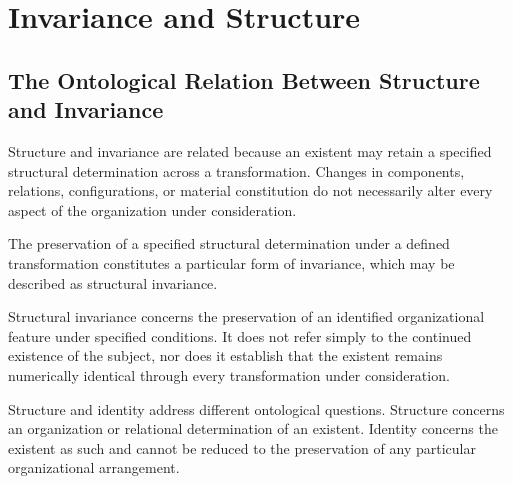 %
%
%
%
%

\section{Invariance and Structure}
\label{sec:invariance-and-structure}

\subsection{The Ontological Relation Between Structure and Invariance}

Structure and invariance are related because an existent
may retain a specified structural determination across
a transformation. Changes in components, relations,
configurations, or material constitution do not necessarily
alter every aspect of the organization under consideration.

The preservation of a specified structural determination
under a defined transformation constitutes a particular
form of invariance, which may be described as structural
invariance.

Structural invariance concerns the preservation of an
identified organizational feature under specified
conditions. It does not refer simply to the continued
existence of the subject, nor does it establish that
the existent remains numerically identical through
every transformation under consideration.

Structure and identity address different ontological
questions. Structure concerns an organization or
relational determination of an existent. Identity
concerns the existent as such and cannot be reduced
to the preservation of any particular organizational
arrangement.

